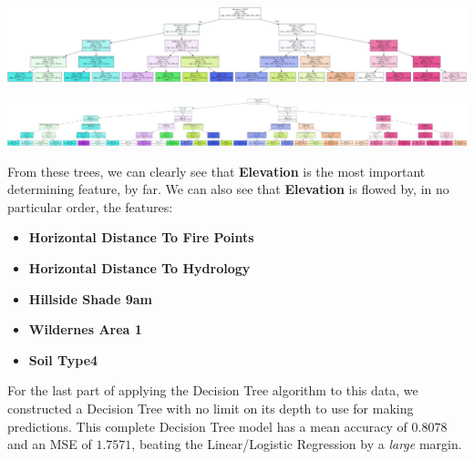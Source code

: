 \documentclass{article}[12pt]
\numberwithin{equation}{subsection}
\begin{document}
\begin{center}
\includegraphics[width=7in]{../decTree2.png}
\end{center}

\begin{center}
\includegraphics[width=7in]{../decTree3.png}
\end{center}
\begin{flushleft}


From these trees, we can clearly see that \textbf{Elevation} is the most important determining feature, by far.  We can also see that \textbf{Elevation} is flowed by, in no particular order, the features:

\begin{itemize}
\item \textbf{Horizontal Distance To Fire Points}
\item \textbf{Horizontal Distance To Hydrology}
\item \textbf{Hillside Shade 9am}
\item \textbf{Wildernes Area 1}
\item \textbf{Soil Type4}
\end{itemize}

For the last part of applying the Decision Tree algorithm to this data, we constructed a Decision Tree with no limit on its depth to use for making predictions.  This complete Decision Tree model has a mean accuracy of $0.8078$ and an MSE of $1.7571$, beating the Linear/Logistic Regression by a \emph{large} margin.


\vspace{1.5in}


\end{flushleft}
\end{document}
